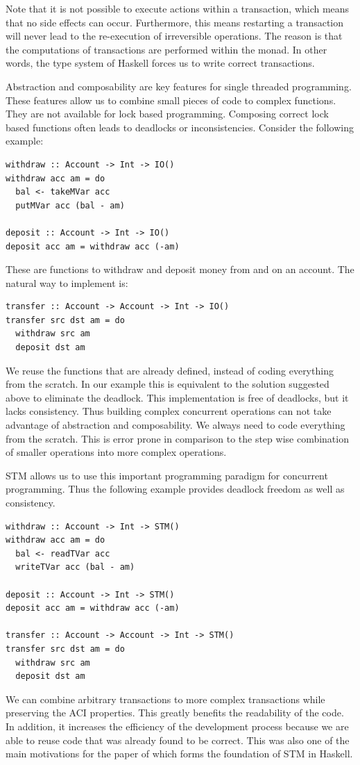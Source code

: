Note that it is not possible to execute  actions within a transaction, which means that no side effects can occur. Furthermore, this means
restarting a transaction will never lead to the re-execution of irreversible operations. The reason is that the computations of transactions
are performed within the  monad. In other words, the type system of Haskell forces us to write correct transactions. 
 
Abstraction and composability are key features for single threaded programming. These features allow us to combine small pieces
of code to complex functions. They are not available for lock based programming. Composing correct lock based
functions often leads to deadlocks or inconsistencies. Consider the following example:
\begin{lstlisting}
withdraw :: Account -> Int -> IO()
withdraw acc am = do 
  bal <- takeMVar acc 
  putMVar acc (bal - am)
 
deposit :: Account -> Int -> IO()
deposit acc am = withdraw acc (-am)
\end{lstlisting}
These are functions to withdraw and deposit money from and on an account. The natural way to implement  is:
\begin{lstlisting}
transfer :: Account -> Account -> Int -> IO()
transfer src dst am = do
  withdraw src am
  deposit dst am
\end{lstlisting}
We reuse the functions that are already defined, instead of coding everything from the scratch. In our example this is equivalent 
to the solution suggested above to eliminate the deadlock. This implementation is free of deadlocks, but it lacks consistency.
Thus building complex concurrent operations can not take advantage of abstraction and composability. We always need to code
everything from the scratch. This is error prone in comparison to the step wise combination of smaller operations into 
more complex operations.

STM allows us to use this important programming paradigm for concurrent programming. Thus the following example provides
deadlock freedom as well as consistency.
\begin{lstlisting}
withdraw :: Account -> Int -> STM()
withdraw acc am = do 
  bal <- readTVar acc 
  writeTVar acc (bal - am)
 
deposit :: Account -> Int -> STM()
deposit acc am = withdraw acc (-am)

transfer :: Account -> Account -> Int -> STM()
transfer src dst am = do
  withdraw src am
  deposit dst am
\end{lstlisting}
We can combine arbitrary transactions to more complex transactions while preserving the ACI properties. This greatly benefits the 
readability of the code. In addition, it increases the efficiency of the development process because we are able to reuse code
that was already found to be correct. This was also one of the main motivations for the paper of \parencite{STMBase} which forms the foundation
of STM in Haskell. 

